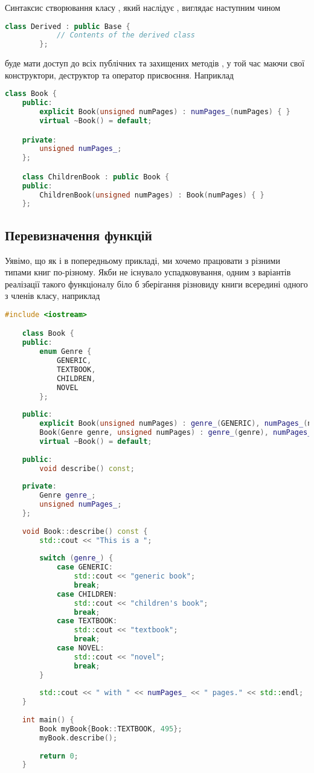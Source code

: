\documentclass[12pt]{article}
\begin{document}
	Синтаксис створювання класу , який наслідує , виглядає наступним чином
	\begin{lstlisting}[language=c++]
		class Derived : public Base {
			// Contents of the derived class
		};
	\end{lstlisting}

	 буде мати доступ до всіх публічних та захищених методів , у той час маючи свої конструктори, деструктор та оператор присвоєння. Наприклад
	\begin{lstlisting}[language=c++]
	class Book {
	public:
		explicit Book(unsigned numPages) : numPages_(numPages) { }
		virtual ~Book() = default;

	private:
		unsigned numPages_;
	};

	class ChildrenBook : public Book {
	public:
		ChildrenBook(unsigned numPages) : Book(numPages) { }
	};
	\end{lstlisting}

	\subsection{Перевизначення функцій}
	Уявімо, що як і в попередньому прикладі, ми хочемо працювати з різними типами книг по-різному. Якби не існувало успадковування, одним з варіантів реалізації такого функціоналу біло б зберігання різновиду книги всередині одного з членів класу, наприклад
	\begin{lstlisting}[language=c++]
	#include <iostream>

	class Book {
	public:
		enum Genre {
			GENERIC,
			TEXTBOOK,
			CHILDREN,
			NOVEL
		};
	
	public:
		explicit Book(unsigned numPages) : genre_(GENERIC), numPages_(numPages) { }
		Book(Genre genre, unsigned numPages) : genre_(genre), numPages_(numPages) { }
		virtual ~Book() = default;
	
	public:
		void describe() const;
	
	private:
		Genre genre_;
		unsigned numPages_;
	};
	
	void Book::describe() const {
		std::cout << "This is a ";
	
		switch (genre_) {
			case GENERIC:
				std::cout << "generic book";
				break;
			case CHILDREN:
				std::cout << "children's book";
				break;
			case TEXTBOOK:
				std::cout << "textbook";
				break;
			case NOVEL:
				std::cout << "novel";
				break;
		}
	
		std::cout << " with " << numPages_ << " pages." << std::endl;
	}
	
	int main() {
		Book myBook{Book::TEXTBOOK, 495};
		myBook.describe();
	
		return 0;
	}
	\end{lstlisting}
\end{document}
